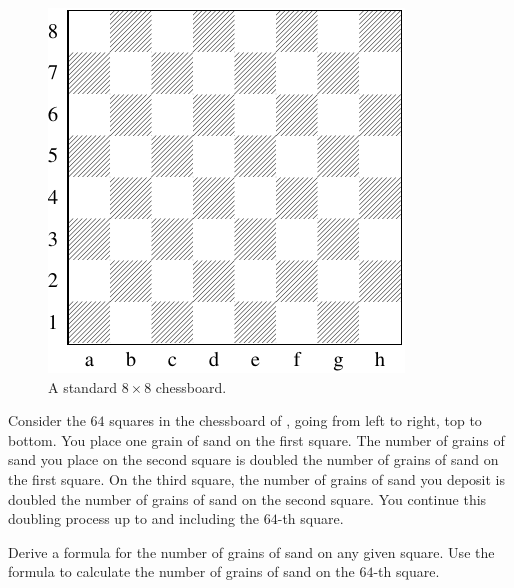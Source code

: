 \documentclass[a4paper,oneside,12pt]{article}
\begin{document}
\begin{problem}

\begin{figure}[!htbp]
\centering
\includegraphics[scale=1.1]{image/11/chessboard.pdf}
\caption{%
  A standard $8 \times 8$ chessboard.
}
\label{fig:chessboard}
\end{figure}

\item Consider the $64$ squares in the chessboard of
  , going from left to right, top to bottom.
  You place one grain of sand on the first square.  The number of
  grains of sand you place on the second square is doubled the number
  of grains of sand on the first square.  On the third square, the
  number of grains of sand you deposit is doubled the number of grains
  of sand on the second square.  You continue this doubling process up
  to and including the $64$-th square.
  \begin{packedenum}
  \item\label{subprob:sand_formula}
    Derive a formula for the number of grains of sand on any given
    square.  Use the formula to calculate the number of grains of sand
    on the $64$-th square.


\end{packedenum}
\end{problem}
\end{document}
